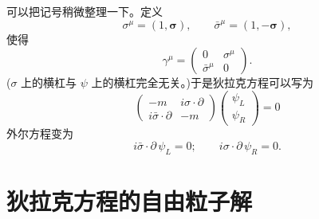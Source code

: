 可以把记号稍微整理一下。定义
\begin{equation}
  \sigma^\mu = (1, \bm{\sigma}),\qquad
  \bar{\sigma}^\mu = (1, -\bm{\sigma}),
  \label{eq:3.43}
\end{equation}
使得
\begin{equation}
  \gamma^\mu = \begin{pmatrix}
    0 & \sigma^\mu\\
    \bar{\sigma}^\mu & 0
  \end{pmatrix}.
  \label{eq:3.44}
\end{equation}
($\sigma$ 上的横杠与 $\psi$ 上的横杠完全无关。)于是狄拉克方程可以写为
\begin{equation}
  \begin{pmatrix}
    -m & i\sigma\cdot\partial\\
    i\bar{\sigma}\cdot\partial & -m
  \end{pmatrix}
  \begin{pmatrix}\psi_L\\ \psi_R\end{pmatrix} = 0
  \label{eq:3.45}
\end{equation}
外尔方程变为
\begin{equation}
  i\bar{\sigma}\cdot\partial\,\psi_L = 0;\qquad
  i\sigma\cdot\partial\,\psi_R = 0 .
  \label{eq:3.46}
\end{equation}

\section{狄拉克方程的自由粒子解}

